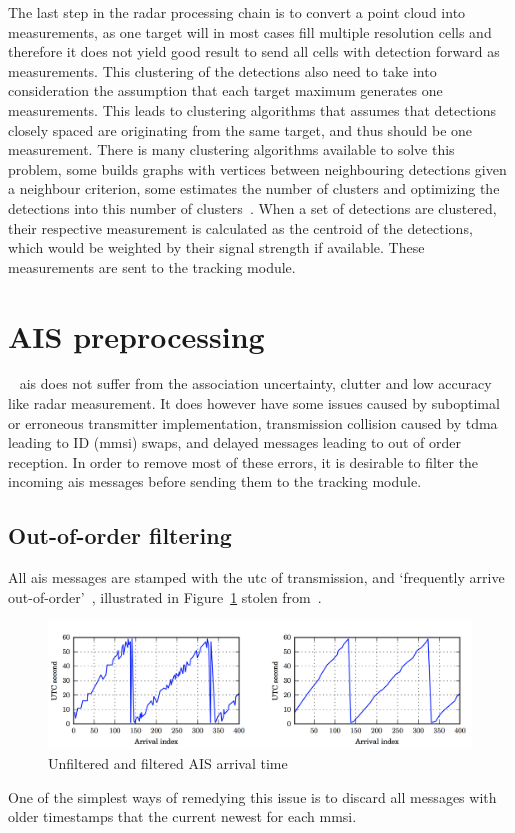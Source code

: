 The last step in the radar processing chain is to convert a point cloud into measurements, as one target will in most cases fill multiple resolution cells and therefore it does not yield good result to send all cells with detection forward as measurements. This clustering of the detections also need to take into consideration the assumption that each target maximum generates one measurements. This leads to clustering algorithms that assumes that detections closely spaced are originating from the same target, and thus should be one measurement. There is many clustering algorithms available to solve this problem, some builds graphs with vertices between neighbouring detections given a neighbour criterion, some estimates the number of clusters and optimizing the detections into this number of clusters~\cite{Mahmuddin2010,Pelleg2000}. When a set of detections are clustered, their respective measurement is calculated as the centroid of the detections, which would be weighted by their signal strength if available. These measurements are sent to the tracking module. 

\section{AIS preprocessing}~\label{sec:ais_preprocessing}
\Gls{ais} does not suffer from the association uncertainty, clutter and low accuracy like radar measurement. It does however have some issues caused by suboptimal or erroneous transmitter implementation, transmission collision caused by \gls{tdma} leading to ID (\gls{mmsi}) swaps, and delayed messages leading to out of order reception. In order to remove most of these errors, it is desirable to filter the incoming \gls{ais} messages before sending them to the tracking module.

\subsection{Out-of-order filtering}
All \gls{ais} messages are stamped with the \gls{utc} of transmission, and `frequently arrive out-of-order'~\cite{Wilthil}, illustrated in Figure~\ref{fig:out_of_order_ais} stolen from~\cite{Wilthil}.
\begin{figure}[H]
\centering
\includegraphics[width = .9\textwidth]{Figures/out_of_order_ais.png}
\caption{Unfiltered and filtered AIS arrival time~\cite{Wilthil}}
\label{fig:out_of_order_ais}
\end{figure}
One of the simplest ways of remedying this issue is to discard all messages with older timestamps that the current newest for each \gls{mmsi}. 

